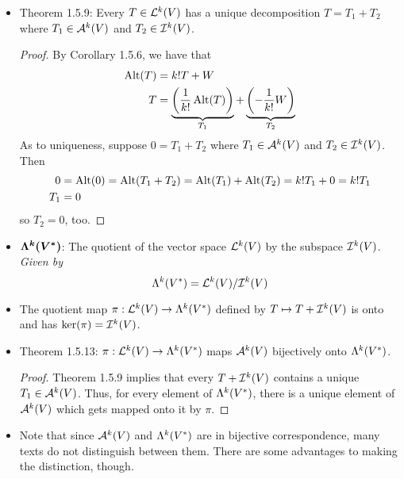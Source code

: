 \documentclass[../notes.tex]{subfiles}
\begin{document}
\begin{itemize}
\begin{proof}
        Now suppose that $T\in\ker(\Alt)$. Then $\Alt(T)=0$, so by Corollary 1.5.6,
        \begin{align*}
            0 &= k!T+W\\
            T &= -\frac{1}{k!}W
        \end{align*}
        Therefore, as a scalar multiple of an element of $\ide[k]{V}$, $T\in\ide[k]{V}$.
    \end{proof}
    \item Theorem 1.5.9: Every $T\in\lin[k]{V}$ has a unique decomposition $T=T_1+T_2$ where $T_1\in\alt[k]{V}$ and $T_2\in\ide[k]{V}$.
    \begin{proof}
        By Corollary 1.5.6, we have that
        \begin{align*}
            \Alt(T) &= k!T+W\\
            T &= \underbrace{\left( \frac{1}{k!}\Alt(T) \right)}_{T_1}+\underbrace{\left( -\frac{1}{k!}W \right)}_{T_2}
        \end{align*}
        As to uniqueness, suppose $0=T_1+T_2$ where $T_1\in\alt[k]{V}$ and $T_2\in\ide[k]{V}$. Then
        \begin{align*}
            0 &= \Alt(0)
                = \Alt(T_1+T_2)
                = \Alt(T_1)+\Alt(T_2)
                = k!T_1+0
                = k!T_1\\
            T_1 &= 0
        \end{align*}
        so $T_2=0$, too.
    \end{proof}
    \item $\bm{\lam[k]{V^*}}$: The quotient of the vector space $\lin[k]{V}$ by the subspace $\ide[k]{V}$. \emph{Given by}
    \begin{equation*}
        \lam[k]{V^*} = \lin[k]{V}/\ide[k]{V}
    \end{equation*}
    \item The quotient map $\pi:\lin[k]{V}\to\lam[k]{V^*}$ defined by $T\mapsto T+\ide[k]{V}$ is onto and has $\ker(\pi)=\ide[k]{V}$.
    \item Theorem 1.5.13: $\pi:\lin[k]{V}\to\lam[k]{V^*}$ maps $\alt[k]{V}$ bijectively onto $\lam[k]{V^*}$.
    \begin{proof}
        Theorem 1.5.9 implies that every $T+\ide[k]{V}$ contains a unique $T_1\in\alt[k]{V}$. Thus, for every element of $\lam[k]{V^*}$, there is a unique element of $\alt[k]{V}$ which gets mapped onto it by $\pi$.
    \end{proof}
    \item Note that since $\alt[k]{V}$ and $\lam[k]{V^*}$ are in bijective correspondence, many texts do not distinguish between them. There are some advantages to making the distinction, though.

\end{itemize}
\end{document}
